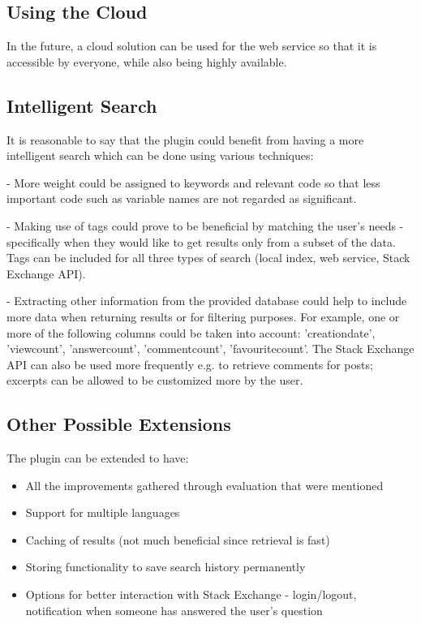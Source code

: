 \documentclass{l4proj}
\begin{document}
\subsection{Using the Cloud}
In the future, a cloud solution can be used for the web service so that it is accessible by everyone, while also being highly available. 

\subsection{Intelligent Search}
It is reasonable to say that the plugin could benefit from having a more intelligent search which can be done using various techniques:

- More weight could be assigned to keywords and relevant code so that less important code such as variable names are not regarded as significant. 

- Making use of tags could prove to be beneficial by matching the user's needs - specifically when they would like to get results only from a subset of the data. Tags can be included for all three types of search (local index, web service, Stack Exchange API).

- Extracting other information from the provided database could help to include more data when returning results or for filtering purposes. For example, one or more of the following columns could be taken into account: 'creationdate', 'viewcount', 'answercount', 'commentcount', 'favouritecount'. The Stack Exchange API \cite{stackexchange} can also be used more frequently e.g. to retrieve comments for posts; excerpts can be allowed to be customized more by the user.

\subsection{Other Possible Extensions}
The plugin can be extended to have:

\begin{itemize}
\item All the improvements gathered through evaluation that were mentioned
\item Support for multiple languages
\item Caching of results (not much beneficial since retrieval is fast)
\item Storing functionality to save search history permanently
\item Options for better interaction with Stack Exchange - login/logout, notification when someone has answered the user's question
\end{itemize}
\end{document}
